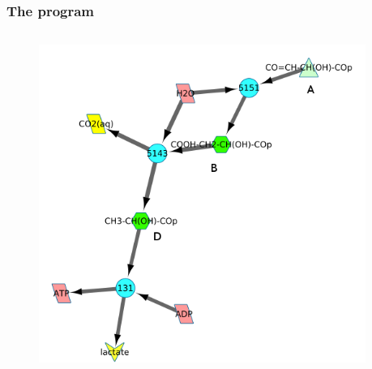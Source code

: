 \documentclass[11pt]{beamer}
\begin{document}
	\begin{frame}
		\frametitle{The program}
		\begin{columns}
			\begin{column}{0.5\textwidth}
				\begin{figure}
					\centering
					\includegraphics[width=1\linewidth]{initial_network_ABC}
					
				\end{figure}
			\end{column}
			
			\begin{column}{0.5\textwidth}
								

\end{column}
\end{columns}
\end{frame}
\end{document}
